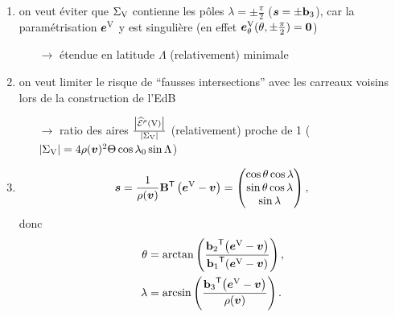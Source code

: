 \begin{enumerate}
    \item on veut éviter que $\Sigma_{\mathrm{V}}$ contienne les pôles $\lambda = \pm \frac{\pi}{2}$ (\ie $\bm{s} = \pm \mathbf{b}_3$), car la paramétrisation $\bm{e}^{\mathrm{V}}$ y est singulière (en effet $\bm{e}^{\mathrm{V}}_{\theta}(\theta, \pm \frac{\pi}{2}) = \bm{0}$)
    \begin{enumerate}
        \item[$\to$] étendue en latitude $\Lambda$ (relativement) minimale
    \end{enumerate}
    \item on veut limiter le risque de ``fausses intersections'' avec les carreaux voisins lors de la construction de l'EdB
    \begin{enumerate}
        \item[$\to$] ratio des aires $\frac{\left| \pseudoEdS{\brepvertex}{\rho} \right|}{\left| \Sigma_{\brepvertex} \right|}$ (relativement) proche de 1 ($\left| \Sigma_{\mathrm{V}} \right| = 4 \rho(\bm{v})^2 \Theta \cos \lambda_0 \sin \Lambda$)
    \end{enumerate}
    
	\item 
	\begin{equation}
	    \bm{s} = \frac{1}{\rho(\bm{v})} {\mathbf{B}} ^\mathsf{T} \left(\bm{e}^{\mathrm{V}} - \bm{v}\right) 
	    = \begin{pmatrix}
	            \cos \theta \cos \lambda \\
	            \sin \theta \cos \lambda \\
	            \sin \lambda \\
	        \end{pmatrix},
	\end{equation}
	donc 
	\begin{align}
	    \theta &= \arctan \left( 
	        \frac{
	            {\mathbf{b}_2} ^\mathsf{T} {\left(\bm{e}^{\mathrm{V}} - \bm{v}\right)}
	        }{
	            {\mathbf{b}_1} ^\mathsf{T} {\left(\bm{e}^{\mathrm{V}} - \bm{v}\right)}
	        }
	    \right), \\
	    \lambda &= \arcsin \left( 
	        \frac{
	            {\mathbf{b}_3} ^\mathsf{T} {\left(\bm{e}^{\mathrm{V}} - \bm{v}\right)}
	        }{
	            \rho(\bm{v})
	        }
	    \right).
	\end{align} 
	

\end{enumerate}

